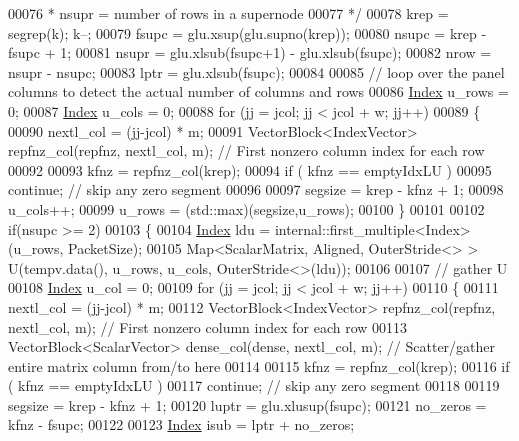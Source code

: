 \begin{DoxyCode}
00076 \textcolor{comment}{     * nsupr = number of rows in a supernode}
00077 \textcolor{comment}{     */}
00078     krep = segrep(k); k--; 
00079     fsupc = glu.xsup(glu.supno(krep)); 
00080     nsupc = krep - fsupc + 1; 
00081     nsupr = glu.xlsub(fsupc+1) - glu.xlsub(fsupc); 
00082     nrow = nsupr - nsupc; 
00083     lptr = glu.xlsub(fsupc); 
00084     
00085     \textcolor{comment}{// loop over the panel columns to detect the actual number of columns and rows}
00086     \hyperlink{namespace_eigen_a62e77e0933482dafde8fe197d9a2cfde}{Index} u\_rows = 0;
00087     \hyperlink{namespace_eigen_a62e77e0933482dafde8fe197d9a2cfde}{Index} u\_cols = 0;
00088     \textcolor{keywordflow}{for} (jj = jcol; jj < jcol + w; jj++)
00089     \{
00090       nextl\_col = (jj-jcol) * m; 
00091       VectorBlock<IndexVector> repfnz\_col(repfnz, nextl\_col, m); \textcolor{comment}{// First nonzero column index for each row}
00092       
00093       kfnz = repfnz\_col(krep); 
00094       \textcolor{keywordflow}{if} ( kfnz == emptyIdxLU ) 
00095         \textcolor{keywordflow}{continue}; \textcolor{comment}{// skip any zero segment}
00096       
00097       segsize = krep - kfnz + 1;
00098       u\_cols++;
00099       u\_rows = (std::max)(segsize,u\_rows);
00100     \}
00101     
00102     \textcolor{keywordflow}{if}(nsupc >= 2)
00103     \{ 
00104       \hyperlink{namespace_eigen_a62e77e0933482dafde8fe197d9a2cfde}{Index} ldu = internal::first\_multiple<Index>(u\_rows, PacketSize);
00105       Map<ScalarMatrix, Aligned,  OuterStride<> > U(tempv.data(), u\_rows, u\_cols, OuterStride<>(ldu));
00106       
00107       \textcolor{comment}{// gather U}
00108       \hyperlink{namespace_eigen_a62e77e0933482dafde8fe197d9a2cfde}{Index} u\_col = 0;
00109       \textcolor{keywordflow}{for} (jj = jcol; jj < jcol + w; jj++)
00110       \{
00111         nextl\_col = (jj-jcol) * m; 
00112         VectorBlock<IndexVector> repfnz\_col(repfnz, nextl\_col, m); \textcolor{comment}{// First nonzero column index for each
       row}
00113         VectorBlock<ScalarVector> dense\_col(dense, nextl\_col, m); \textcolor{comment}{// Scatter/gather entire matrix column
       from/to here}
00114         
00115         kfnz = repfnz\_col(krep); 
00116         \textcolor{keywordflow}{if} ( kfnz == emptyIdxLU ) 
00117           \textcolor{keywordflow}{continue}; \textcolor{comment}{// skip any zero segment}
00118         
00119         segsize = krep - kfnz + 1;
00120         luptr = glu.xlusup(fsupc);    
00121         no\_zeros = kfnz - fsupc; 
00122         
00123         \hyperlink{namespace_eigen_a62e77e0933482dafde8fe197d9a2cfde}{Index} isub = lptr + no\_zeros;

\end{DoxyCode}

